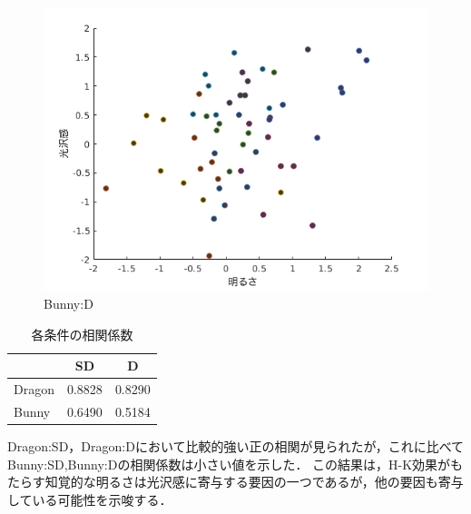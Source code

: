     \begin{figure}[h]
        \centering
        \includegraphics[width=12.0cm]{./img/ex3_BD.png}
        \caption{Bunny:D}
        \label{ex3_BD}
    \end{figure}

    \begin{table}[h]
        \centering
        \caption{各条件の相関係数}
        \begin{tabular}{|l||c|c|} \hline
                        & SD       & D        \\ \hline \hline
            Dragon      & 0.8828   & 0.8290   \\ \hline
            Bunny       & 0.6490   & 0.5184   \\ \hline
        \end{tabular}
    \end{table}

    Dragon:SD，Dragon:Dにおいて比較的強い正の相関が見られたが，これに比べてBunny:SD,Bunny:Dの相関係数は小さい値を示した．
    この結果は，H-K効果がもたらす知覚的な明るさは光沢感に寄与する要因の一つであるが，他の要因も寄与している可能性を示唆する．